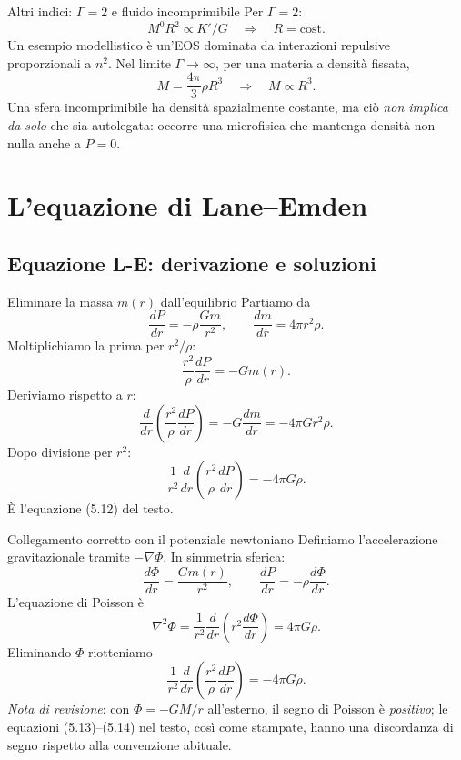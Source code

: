 \begin{frame}[t]{Altri indici: $\Gamma=2$ e fluido incomprimibile}
\small
Per $\Gamma=2$:
\[
M^0R^2\propto K'/G\quad\Longrightarrow\quad R=\mathrm{cost.}
\]
Un esempio modellistico è un'EOS dominata da interazioni repulsive proporzionali a $n^2$.
\medskip
Nel limite $\Gamma\to\infty$, per una materia a densità fissata,
\[
M=\frac{4\pi}3\rho R^3\quad\Longrightarrow\quad M\propto R^3.
\]
Una sfera incomprimibile ha densità spazialmente costante, ma ciò \emph{non implica da solo} che sia autolegata: occorre una microfisica che mantenga densità non nulla anche a $P=0$.
\end{frame}

\section{L'equazione di Lane--Emden}

\subsection{Equazione L-E: derivazione e soluzioni}\label{ssec:laneemden}

\begin{frame}[t]{Eliminare la massa $m(r)$ dall'equilibrio}
\small
Partiamo da
\[
\frac{dP}{dr}=-\rho\frac{Gm}{r^2},\qquad
\frac{dm}{dr}=4\pi r^2\rho.
\]
Moltiplichiamo la prima per $r^2/\rho$:
\[
\frac{r^2}{\rho}\frac{dP}{dr}=-Gm(r).
\]
Deriviamo rispetto a $r$:
\[
\frac{d}{dr}\left(\frac{r^2}{\rho}\frac{dP}{dr}\right)
=-G\frac{dm}{dr}=-4\pi G r^2\rho.
\]
Dopo divisione per $r^2$:
\[
\frac1{r^2}\frac{d}{dr}\left(\frac{r^2}{\rho}\frac{dP}{dr}\right)=-4\pi G\rho.
\]
È l'equazione (5.12) del testo.
\end{frame}

\begin{frame}[t]{Collegamento corretto con il potenziale newtoniano}
\small
Definiamo l'accelerazione gravitazionale tramite $-\nabla\Phi$. In simmetria sferica:
\[
\frac{d\Phi}{dr}=\frac{Gm(r)}{r^2},\qquad
\frac{dP}{dr}=-\rho\frac{d\Phi}{dr}.
\]
L'equazione di Poisson è
\[
\nabla^2\Phi=\frac1{r^2}\frac{d}{dr}
\left(r^2\frac{d\Phi}{dr}\right)=4\pi G\rho.
\]
Eliminando $\Phi$ riotteniamo
\[
\frac1{r^2}\frac{d}{dr}\left(\frac{r^2}{\rho}\frac{dP}{dr}\right)=-4\pi G\rho.
\]
\emph{Nota di revisione}: con $\Phi=-GM/r$ all'esterno, il segno di Poisson è \emph{positivo}; le equazioni (5.13)--(5.14) nel testo, così come stampate, hanno una discordanza di segno rispetto alla convenzione abituale.
\end{frame}

